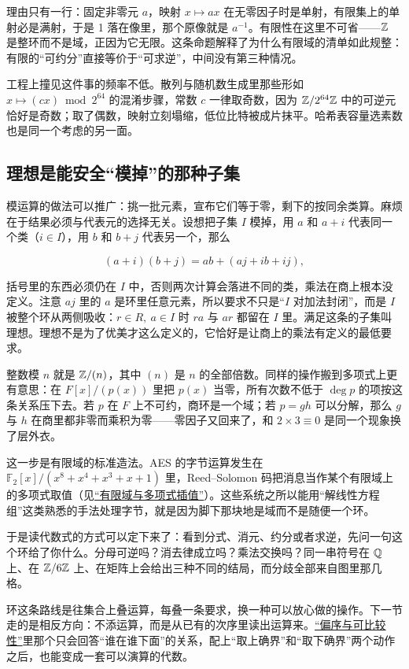 理由只有一行：固定非零元 \(a\)，映射 \(x\mapsto ax\) 在无零因子时是单射，有限集上的单射必是满射，于是 1 落在像里，那个原像就是 \(a^{-1}\)。有限性在这里不可省——\(\mathbb{Z}\) 是整环而不是域，正因为它无限。这条命题解释了为什么有限域的清单如此规整：有限的``可约分''直接等价于``可求逆''，中间没有第三种情况。

工程上撞见这件事的频率不低。散列与随机数生成里那些形如 \(x\mapsto (cx)\bmod 2^{64}\) 的混淆步骤，常数 \(c\) 一律取奇数，因为 \(\mathbb{Z}/2^{64}\mathbb{Z}\) 中的可逆元恰好是奇数；取了偶数，映射立刻塌缩，低位比特被成片抹平。哈希表容量选素数也是同一个考虑的另一面。

\subsection{理想是能安全``模掉''的那种子集}

模运算的做法可以推广：挑一批元素，宣布它们等于零，剩下的按同余类算。麻烦在于结果必须与代表元的选择无关。设想把子集 \(I\) 模掉，用 \(a\) 和 \(a+i\) 代表同一个类（\(i\in I\)），用 \(b\) 和 \(b+j\) 代表另一个，那么

\[
(a+i)(b+j)=ab+(aj+ib+ij),
\]

括号里的东西必须仍在 \(I\) 中，否则两次计算会落进不同的类，乘法在商上根本没定义。注意 \(aj\) 里的 \(a\) 是环里任意元素，所以要求不只是``\(I\) 对加法封闭''，而是 \(I\) 被整个环从两侧吸收：\(r\in R,\ a\in I\) 时 \(ra\) 与 \(ar\) 都留在 \(I\) 里。满足这条的子集叫理想。理想不是为了优美才这么定义的，它恰好是让商上的乘法有定义的最低要求。

整数模 \(n\) 就是 \(\mathbb{Z}/(n)\)，其中 \((n)\) 是 \(n\) 的全部倍数。同样的操作搬到多项式上更有意思：在 \(F[x]/(p(x))\) 里把 \(p(x)\) 当零，所有次数不低于 \(\deg p\) 的项按这条关系压下去。若 \(p\) 在 \(F\) 上不可约，商环是一个域；若 \(p=gh\) 可以分解，那么 \(g\) 与 \(h\) 在商里都非零而乘积为零——零因子又回来了，和 \(2\times3\equiv0\) 是同一个现象换了层外衣。

这一步是有限域的标准造法。AES 的字节运算发生在 \(\mathbb F_2[x]/(x^8+x^4+x^3+x+1)\) 里，Reed--Solomon 码把消息当作某个有限域上的多项式取值（见\hyperref[sec:04-Discrete-Mathematics/05-Coding-and-Polynomial-Methods/01]{``有限域与多项式插值''}）。这些系统之所以能用``解线性方程组''这类熟悉的手法处理字节，就是因为脚下那块地是域而不是随便一个环。

于是读代数式的方式可以定下来了：看到分式、消元、约分或者求逆，先问一句这个环给了你什么。分母可逆吗？消去律成立吗？乘法交换吗？同一串符号在 \(\mathbb{Q}\) 上、在 \(\mathbb{Z}/6\mathbb{Z}\) 上、在矩阵上会给出三种不同的结局，而分歧全部来自图里那几格。

环这条路线是往集合上叠运算，每叠一条要求，换一种可以放心做的操作。下一节走的是相反方向：不添运算，而是从已有的次序里读出运算来。\hyperref[sec:01-Mathematical-Language/02-Sets-Relations-Functions/03]{``偏序与可比较性''}里那个只会回答``谁在谁下面''的关系，配上``取上确界''和``取下确界''两个动作之后，也能变成一套可以演算的代数。
